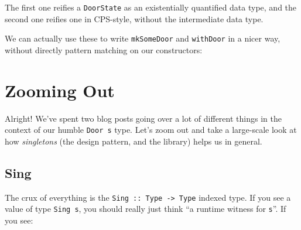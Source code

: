 \documentclass[]{article}
\newenvironment{Shaded}{}{}
\newcommand{\KeywordTok}[1]{\textcolor[rgb]{0.00,0.44,0.13}{\textbf{#1}}}
\newcommand{\DataTypeTok}[1]{\textcolor[rgb]{0.56,0.13,0.00}{#1}}
\newcommand{\CommentTok}[1]{\textcolor[rgb]{0.38,0.63,0.69}{\textit{#1}}}
\newcommand{\OtherTok}[1]{\textcolor[rgb]{0.00,0.44,0.13}{#1}}
\newcommand{\FunctionTok}[1]{\textcolor[rgb]{0.02,0.16,0.49}{#1}}
\newcommand{\NormalTok}[1]{#1}
\begin{document}
The first one reifies a \texttt{DoorState} as an existentially quantified data
type, and the second one reifies one in CPS-style, without the intermediate data
type.

We can actually use these to write \texttt{mkSomeDoor} and \texttt{withDoor} in
a nicer way, without directly pattern matching on our constructors:

\begin{Shaded}
\end{Shaded}

\section{Zooming Out}\label{zooming-out}

Alright! We've spent two blog posts going over a lot of different things in the
context of our humble \texttt{Door\ s} type. Let's zoom out and take a
large-scale look at how \emph{singletons} (the design pattern, and the library)
helps us in general.

\subsection{Sing}\label{sing}

The crux of everything is the \texttt{Sing\ ::\ Type\ -\textgreater{}\ Type}
indexed type. If you see a value of type \texttt{Sing\ s}, you should really
just think ``a runtime witness for \texttt{s}''. If you see:
\end{document}
